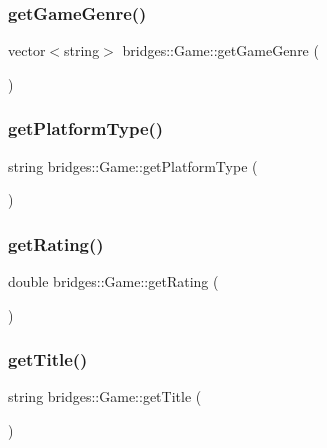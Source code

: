 \subsubsection{\texorpdfstring{get\+Game\+Genre()}{getGameGenre()}}
{\footnotesize\ttfamily vector$<$string$>$ bridges\+::\+Game\+::get\+Game\+Genre (\begin{DoxyParamCaption}{ }\end{DoxyParamCaption})\hspace{0.3cm}{\ttfamily [inline]}}

\mbox{\label{classbridges_1_1_game_a6b7ff7e0fa411787338c70942cf0ebcb}} 
\subsubsection{\texorpdfstring{get\+Platform\+Type()}{getPlatformType()}}
{\footnotesize\ttfamily string bridges\+::\+Game\+::get\+Platform\+Type (\begin{DoxyParamCaption}{ }\end{DoxyParamCaption})\hspace{0.3cm}{\ttfamily [inline]}}

\mbox{\label{classbridges_1_1_game_a8deb9c403f2e16bede39a1486829742d}} 
\subsubsection{\texorpdfstring{get\+Rating()}{getRating()}}
{\footnotesize\ttfamily double bridges\+::\+Game\+::get\+Rating (\begin{DoxyParamCaption}{ }\end{DoxyParamCaption})\hspace{0.3cm}{\ttfamily [inline]}}

\mbox{\label{classbridges_1_1_game_a66917b204312a7996585e5d4b56a1add}} 
\subsubsection{\texorpdfstring{get\+Title()}{getTitle()}}
{\footnotesize\ttfamily string bridges\+::\+Game\+::get\+Title (\begin{DoxyParamCaption}{ }\end{DoxyParamCaption})\hspace{0.3cm}{\ttfamily [inline]}}

